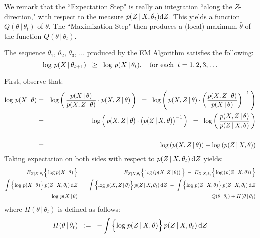 \begin{remark}\quad
We remark that the ``Expectation Step" is really an integration ``along the $Z$-direction,"
with respect to the measure $p(Z\,|\,X,\theta_{t})\textnormal{d}Z$.
This yields a function $Q(\theta\,|\,\theta_{t})$ of $\theta$.
The ``Maximization Step" then produces a (local) maximum $\widehat{\theta}$ of the function
$Q(\theta\,|\,\theta_{t})$.
\end{remark}
\begin{theorem}\quad
The sequence $\theta_{1}$, $\theta_{2}$, $\theta_{3}$, $\ldots$ produced by the EM Algorithm
satisfies the following:
\begin{equation*}
\log\,p(X\,|\,\theta_{t+1}) \;\; \geq \;\; \log\,p(X\,|\,\theta_{t}),
\quad
\textnormal{for each}\;\;t = 1, 2, 3, \ldots
\end{equation*}
\end{theorem}
\proof First, observe that:
\begin{eqnarray*}
\log\,p(X\,|\,\theta)
& = &
	\log\left(\,\dfrac{p(X\,\vert\,\theta)}{p(X,Z\,\vert\,\theta)} \cdot p(X,Z\,\vert\,\theta)\,\right)
\;\;=\;\;
	\log\left(\,p(X,Z\,\vert\,\theta) \cdot \left(\dfrac{p(X,Z\,\vert\,\theta)}{p(X\,\vert\,\theta)}\right)^{-1} \,\right)
\\
&=&
	\log\left(\,p(X,Z\,\vert\,\theta) \cdot \left(\overset{{\color{white}.}}{p}(Z\,\vert\,X,\theta)\right)^{-1} \,\right)
\;\;=\;\;
	\log\left(\,\dfrac{p(X,Z\,\vert\,\theta)}{p(Z\,\vert\,X,\theta)}\,\right)
\\
&&
\\
& = &
	\log\left(p(X,Z\,|\,\theta)\right) - \log\left(p(Z\,|\,X,\theta)\right)
\end{eqnarray*}
Taking expectation on both sides with respect to $p(Z\,|\,X,\theta_{t})\,\textnormal{d}Z$ yields:
\begin{eqnarray*}
E_{Z|X,\theta_{t}}\!\left\{\,\overset{{\color{white}.}}{\log}\,p(X\,|\,\theta)\,\right\}
& = &
E_{Z|X,\theta_{t}}\!\left\{\,\overset{{\color{white}.}}{\log}\left(p(X,Z\,|\,\theta)\right)\,\right\}
\;-\;
E_{Z|X,\theta_{t}}\!\left\{\,\overset{{\color{white}.}}{\log}\left(p(Z\,|\,X,\theta)\right)\,\right\}
\\
\int\left\{\overset{{\color{white}.}}{\log}\;p(X\,|\,\theta)\right\}p(Z\,|\,X,\theta_{t})\,\textnormal{d}Z
& = &
\int\left\{\overset{{\color{white}.}}{\log}\;p(X,Z\,|\,\theta)\right\}p(Z\,|\,X,\theta_{t})\,\textnormal{d}Z
\;-\;
\int\left\{\overset{{\color{white}.}}{\log}\;p(Z\,|\,X,\theta)\right\}p(Z\,|\,X,\theta_{t})\,\textnormal{d}Z
\\
\log\,p(X\,|\,\theta)
& = &
Q(\theta\,|\,\theta_{t}) + H(\theta\,|\,\theta_{t})
\end{eqnarray*}
where $H(\theta\,|\,\theta_{t})$ is defined as follows:
\begin{equation*}
H(\theta\,|\,\theta_{t})
\;\; := \;\;
- \int\left\{\overset{{\color{white}.}}{\log}\;p(Z\,|\,X,\theta)\right\}p(Z\,|\,X,\theta_{t})\,\textnormal{d}Z
\end{equation*}

